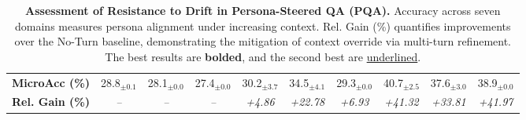 \begin{table}[t]
{\begin{tabular}{l ccc ccc ccc}
\textbf{MicroAcc (\%)} & 28.8$_{\pm 0.1}$ & 28.1$_{\pm 0.0}$ & 27.4$_{\pm 0.0}$ & 30.2$_{\pm 3.7}$ & 34.5$_{\pm 4.1}$ & 29.3$_{\pm 0.0}$ & 40.7$_{\pm 2.5}$ & 37.6$_{\pm 3.0}$ & 38.9$_{\pm 0.0}$ \\
\rowcolor{gray!10}\textbf{Rel. Gain (\%)} & \textit{--} & \textit{--} & \textit{--} & \textit{+4.86} & \textit{+22.78} & \textit{+6.93} & \textit{+41.32} & \textit{+33.81} & \textit{+41.97} \\
\bottomrule
\end{tabular}}
\caption{\textbf{Assessment of Resistance to Drift in Persona-Steered QA (PQA).} Accuracy across seven domains measures persona alignment under increasing context. \colorbox{gray!10}{Rel. Gain (\%)} quantifies improvements over the No-Turn baseline, demonstrating the mitigation of context override via multi-turn refinement. The best results are \textbf{bolded}, and the second best are \underline{underlined}.}
\label{tab:mcq}
\end{table}










